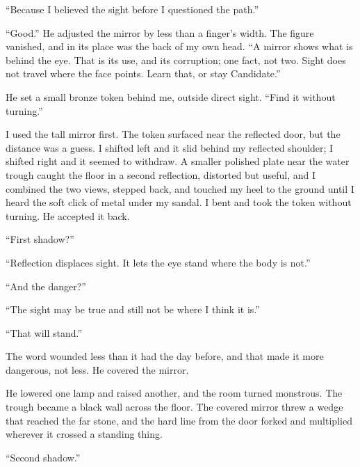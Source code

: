 ``Because I believed the sight before I questioned the path.''\par

``Good.'' He adjusted the mirror by less than a finger's width. The figure vanished, and in its place was the back of my own head. ``A mirror shows what is behind the eye. That is its use, and its corruption; one fact, not two. Sight does not travel where the face points. Learn that, or stay Candidate.''\par

He set a small bronze token behind me, outside direct sight. ``Find it without turning.''\par

I used the tall mirror first. The token surfaced near the reflected door, but the distance was a guess. I shifted left and it slid behind my reflected shoulder; I shifted right and it seemed to withdraw. A smaller polished plate near the water trough caught the floor in a second reflection, distorted but useful, and I combined the two views, stepped back, and touched my heel to the ground until I heard the soft click of metal under my sandal. I bent and took the token without turning. He accepted it back.\par

``First shadow?''\par

``Reflection displaces sight. It lets the eye stand where the body is not.''\par

``And the danger?''\par

``The sight may be true and still not be where I think it is.''\par

``That will stand.''\par

The word wounded less than it had the day before, and that made it more dangerous, not less. He covered the mirror.\par

\ornament

He lowered one lamp and raised another, and the room turned monstrous. The trough became a black wall across the floor. The covered mirror threw a wedge that reached the far stone, and the hard line from the door forked and multiplied wherever it crossed a standing thing.\par

``Second shadow.''\par

